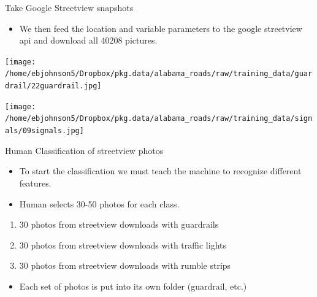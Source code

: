 \documentclass[ignorenonframetext,]{beamer}
\providecommand{\tightlist}{%
  \setlength{\itemsep}{0pt}\setlength{\parskip}{0pt}}
\begin{document}
\begin{frame}{Take Google Streetview snapshots}

\begin{itemize}
\tightlist
\item
  We then feed the location and variable parameters to the google
  streetview api and download all 40208 pictures.
\end{itemize}

\texttt{[image: /home/ebjohnson5/Dropbox/pkg.data/alabama\_roads/raw/training\_data/guardrail/22guardrail.jpg]}

\end{frame}

\begin{frame}{}

\texttt{[image: /home/ebjohnson5/Dropbox/pkg.data/alabama\_roads/raw/training\_data/signals/09signals.jpg]}

\end{frame}

\begin{frame}{Human Classification of streetview photos}

\begin{itemize}
\tightlist
\item
  To start the classification we must teach the machine to recognize
  different features.
\item
  Human selects 30-50 photos for each class.
\end{itemize}

\begin{enumerate}
\def\labelenumi{\arabic{enumi}.}
\tightlist
\item
  30 photos from streetview downloads with guardrails
\item
  30 photos from streetview downloads with traffic lights
\item
  30 photos from streetview downloads with rumble strips
\end{enumerate}

\begin{itemize}
\tightlist
\item
  Each set of photos is put into its own folder (guardrail, etc.)
\end{itemize}

\end{frame}
\end{document}
